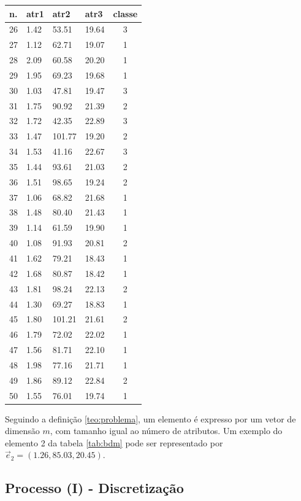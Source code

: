 \begin{table}[!ht]
\begin{tabular}{ |l|l|l|l|c| }
\hline
n.  & atr1 & atr2 & atr3 & classe \\ \hline
26 & 1.42 & 53.51 & 19.64 & 3 \\ \hline
27 & 1.12 & 62.71 & 19.07 & 1 \\ \hline
28 & 2.09 & 60.58 & 20.20 & 1 \\ \hline
29 & 1.95 & 69.23 & 19.68 & 1 \\ \hline
30 & 1.03 & 47.81 & 19.47 & 3 \\ \hline
31 & 1.75 & 90.92 & 21.39 & 2 \\ \hline
32 & 1.72 & 42.35 & 22.89 & 3 \\ \hline
33 & 1.47 & 101.77 & 19.20 & 2 \\ \hline
34 & 1.53 & 41.16 & 22.67 & 3 \\ \hline
35 & 1.44 & 93.61 & 21.03 & 2 \\ \hline
36 & 1.51 & 98.65 & 19.24 & 2 \\ \hline
37 & 1.06 & 68.82 & 21.68 & 1 \\ \hline
38 & 1.48 & 80.40 & 21.43 & 1 \\ \hline
39 & 1.14 & 61.59 & 19.90 & 1 \\ \hline
40 & 1.08 & 91.93 & 20.81 & 2 \\ \hline
41 & 1.62 & 79.21 & 18.43 & 1 \\ \hline
42 & 1.68 & 80.87 & 18.42 & 1 \\ \hline
43 & 1.81 & 98.24 & 22.13 & 2 \\ \hline
44 & 1.30 & 69.27 & 18.83 & 1 \\ \hline
45 & 1.80 & 101.21 & 21.61 & 2 \\ \hline
46 & 1.79 & 72.02 & 22.02 & 1 \\ \hline
47 & 1.56 & 81.71 & 22.10 & 1 \\ \hline
48 & 1.98 & 77.16 & 21.71 & 1 \\ \hline
49 & 1.86 & 89.12 & 22.84 & 2 \\ \hline
50 & 1.55 & 76.01 & 19.74 & 1 \\ \hline
\end{tabular}
\end{table}

Seguindo a definição \ref{teo:problema}, um elemento é expresso por um vetor  de dimensão ${m}$, com tamanho igual ao número de atributos. Um exemplo do elemento 2 da tabela \ref{tab:bdm} pode ser representado por ${\vec{e}_{2}=(1.26,85.03, 20.45)}$.

\subsection{Processo (I) - Discretização} \label{cap:ferramentas:ssec:disc}

